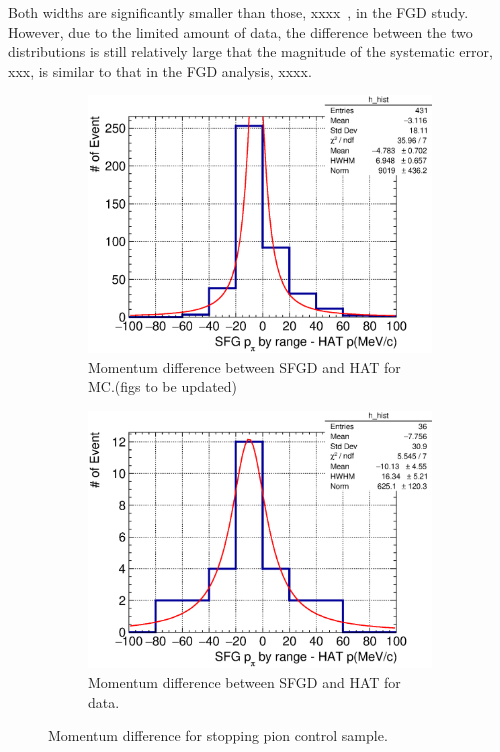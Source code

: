           Both widths are significantly smaller than those, xxxx~\cite{Jenkins:2022ljx}, in the FGD study.
          However, due to the limited amount of data, the difference between the two distributions is still relatively large that the magnitude of the systematic error, xxx, is similar to that in the FGD analysis, xxxx. 
          \begin{figure}[h]
          \centering
          \begin{subfigure}[h]{\dbfigwid\textwidth}
          \centering
          \includegraphics[width=\textwidth]{figures/sel/sspi_TOP_pi_mombr_hatp_difhist_al6_mc.eps}
          \caption{Momentum difference between SFGD and HAT for MC.(figs to be updated)}
          \label{subfig:sfgp-hatp-dif-mc}
          \end{subfigure}
          \hfill
          \begin{subfigure}[h]{\dbfigwid\textwidth}
          \centering
          \includegraphics[width=\textwidth]{figures/sel/sspi_TOP_pi_mombr_hatp_difhist_al4_CombHAT_data.eps}
          \caption{Momentum difference between SFGD and HAT for data.}
          \label{subfig:sfgp-hatp-dif-data}
          \end{subfigure}
          \caption{Momentum difference for stopping pion control sample.}
          \label{fig:sppi-res}
          \end{figure}

